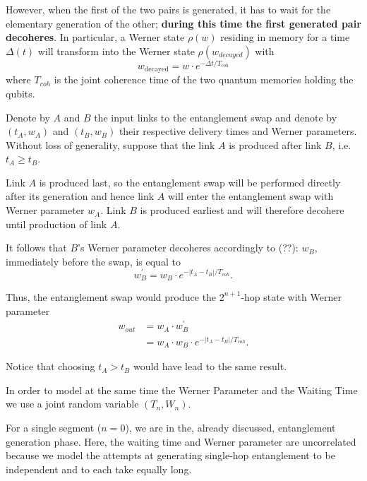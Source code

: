 \documentclass{masterthesis}
\begin{document}
However, when the first of the two pairs is generated, it has to wait for the elementary generation of the other; \textbf{during this time the first generated pair decoheres}. In particular, a Werner state $\rho(w)$ residing in memory for a time $\Delta(t)$ will transform into the Werner state $\rho(w_{decayed})$ with 
\begin{equation}
    w_{\text{decayed}} = w \cdot e^{-\Delta t / T_{coh}}
\end{equation}
where $T_{coh}$ is the joint coherence time of the two quantum memories holding the qubits. %

Denote by $A$ and $B$ the input links to the entanglement swap and denote by $\left(t_{A}, w_{A}\right)$ and $\left(t_{B}, w_{B}\right)$ their respective delivery times and Werner parameters. 
Without loss of generality, suppose that the link $A$ is produced after link $B$, i.e. $t_{A} \geq t_{B}$. 

Link $A$ is produced last, so the entanglement swap will be performed directly after its generation and hence link $A$ will enter the entanglement swap with Werner parameter $w_{A}$. Link $B$ is produced earliest and will therefore decohere until production of link $A$.

It follows that $B$'s Werner parameter decoheres accordingly to (??): $w_B$, immediately before the swap, is equal to
\begin{equation*}
    w_{B}^{\prime} = w_{B} \cdot e^{-\left|t_{A}-t_{B}\right| / T_{coh}} .
\end{equation*}

Thus, the entanglement swap would produce the $2^{n+1}$-hop state with Werner parameter
\begin{align}
w_{out} &= w_{A} \cdot w_{B}^{\prime} \nonumber \\
        &= w_{A} \cdot w_{B} \cdot e^{-\left|t_{A}-t_{B}\right| / T_{coh}} .
\end{align}

Notice that choosing $t_{A} > t_{B}$ would have lead to the same result.

In order to model at the same time the Werner Parameter and the Waiting Time we use a joint random variable $(T_n, W_n)$.

For a single segment ($n=0$), we are in the, already discussed, entanglement generation phase. %
Here, the waiting time and Werner parameter are uncorrelated because we model the attempts at generating single-hop entanglement to be independent and to each take equally long. 
\end{document}
